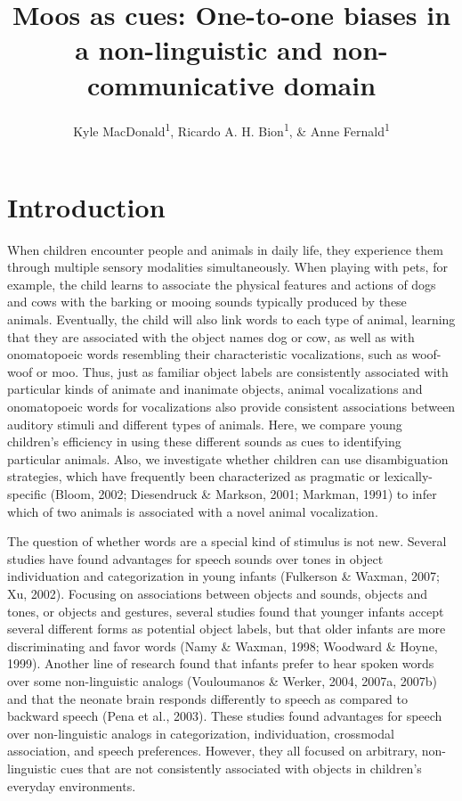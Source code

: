 \documentclass[english,floatsintext,man]{apa6}
\title{Moos as cues: One-to-one biases in a non-linguistic and
non-communicative domain}
\author{Kyle MacDonald\textsuperscript{1}, Ricardo A. H. Bion\textsuperscript{1}, \& Anne Fernald\textsuperscript{1}}
\affiliation{
    \vspace{0.5cm}
          \textsuperscript{1} Stanford University  }
\theoremstyle{definition}
\theoremstyle{definition}
\theoremstyle{definition}
\theoremstyle{remark}
\begin{document}
\maketitle

\setcounter{secnumdepth}{0}



\hypertarget{introduction}{%
\section{Introduction}\label{introduction}}

When children encounter people and animals in daily life, they
experience them through multiple sensory modalities simultaneously. When
playing with pets, for example, the child learns to associate the
physical features and actions of dogs and cows with the barking or
mooing sounds typically produced by these animals. Eventually, the child
will also link words to each type of animal, learning that they are
associated with the object names dog or cow, as well as with
onomatopoeic words resembling their characteristic vocalizations, such
as woof-woof or moo. Thus, just as familiar object labels are
consistently associated with particular kinds of animate and inanimate
objects, animal vocalizations and onomatopoeic words for vocalizations
also provide consistent associations between auditory stimuli and
different types of animals. Here, we compare young children's efficiency
in using these different sounds as cues to identifying particular
animals. Also, we investigate whether children can use disambiguation
strategies, which have frequently been characterized as pragmatic or
lexically-specific (Bloom, 2002; Diesendruck \& Markson, 2001; Markman,
1991) to infer which of two animals is associated with a novel animal
vocalization.

The question of whether words are a special kind of stimulus is not new.
Several studies have found advantages for speech sounds over tones in
object individuation and categorization in young infants (Fulkerson \&
Waxman, 2007; Xu, 2002). Focusing on associations between objects and
sounds, objects and tones, or objects and gestures, several studies
found that younger infants accept several different forms as potential
object labels, but that older infants are more discriminating and favor
words (Namy \& Waxman, 1998; Woodward \& Hoyne, 1999). Another line of
research found that infants prefer to hear spoken words over some
non-linguistic analogs (Vouloumanos \& Werker, 2004, 2007a, 2007b) and
that the neonate brain responds differently to speech as compared to
backward speech (Pena et al., 2003). These studies found advantages for
speech over non-linguistic analogs in categorization, individuation,
crossmodal association, and speech preferences. However, they all
focused on arbitrary, non-linguistic cues that are not consistently
associated with objects in children's everyday environments.
\end{document}
